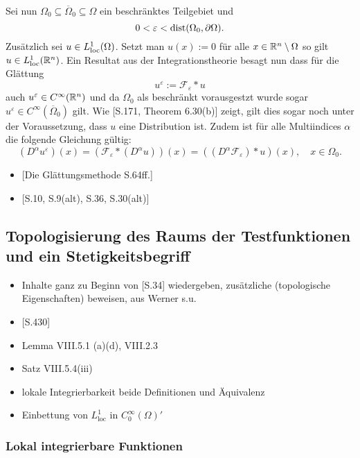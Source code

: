 Sei nun $\Omega_0 \subseteq \overline\Omega_0 \subseteq \Omega$ ein beschränktes Teilgebiet und
$$
0 < \varepsilon < \operatorname{dist}(\Omega_0, \partial\Omega).
$$
Zusätzlich sei $u \in L^1_{\operatorname{loc}}(\Omega)$.
Setzt man $u(x) := 0$ für alle $x \in \mathbb{R}^n \setminus \Omega$ so gilt $u \in L^1_{\operatorname{loc}}(\mathbb{R}^n)$.
Ein Resultat aus der Integrationstheorie besagt nun dass für die Glättung
$$
u^\varepsilon := \mathcal{F}_\varepsilon \ast u
$$
auch $u^\varepsilon \in C^\infty(\mathbb{R}^n)$ und da $\Omega_0$ als beschränkt vorausgestzt wurde sogar $u^\varepsilon \in C^\infty(\overline\Omega_0)$ gilt.
Wie \cite{rudin1991fa}[S.171, Theorem 6.30(b)] zeigt, gilt dies sogar noch unter der Voraussetzung, dass $u$ eine Distribution ist.
Zudem ist für alle Multiindices $\alpha$ die folgende Gleichung gültig:
\begin{equation}
  (D^\alpha u^\varepsilon)(x) 
  = (\mathcal{F}_\varepsilon \ast (D^\alpha u))(x)
  = ( (D^\alpha \mathcal{F}_\varepsilon) \ast u)(x), \quad x \in \Omega_0.
\end{equation}



\begin{itemize}
  \item \cite{sohr2001navier}[Die Glättungsmethode S.64ff.]
  \item \cite{adams2003sobolev}[S.10, S.9(alt), S.36, S.30(alt)]
\end{itemize}

\subsection{Topologisierung des Raums der Testfunktionen und ein Stetigkeitsbegriff}

\begin{itemize}
  \item Inhalte ganz zu Beginn von \cite{sohr2001navier}[S.34] wiedergeben, zusätzliche (topologische Eigenschaften) beweisen, aus Werner s.u.
  \item \cite{werner2011fa}[S.430]
  \item Lemma VIII.5.1 (a)(d), VIII.2.3
  \item Satz VIII.5.4(iii)
  \item lokale Integrierbarkeit beide Definitionen und Äquivalenz
  \item Einbettung von $L^1_{\mathrm{loc}}$ in $C_0^\infty(\Omega)'$
\end{itemize}

\subsubsection{Lokal integrierbare Funktionen}

